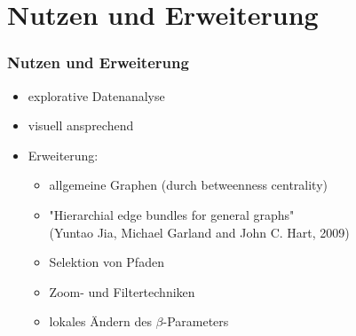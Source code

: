 \documentclass[11pt]{beamer}
\begin{document}
\section{Nutzen und Erweiterung}
\begin{frame}
\frametitle{Nutzen und Erweiterung}

\begin{itemize}
\item explorative Datenanalyse
\item visuell ansprechend
\item Erweiterung:
\begin{itemize} 
\item allgemeine Graphen (durch betweenness centrality)
\item "Hierarchial edge bundles for general graphs" 
\\(Yuntao Jia, Michael Garland and John C. Hart, 2009)
\item Selektion von Pfaden
\item Zoom- und Filtertechniken
\item lokales Ändern des $\beta$-Parameters 
\end{itemize}
\end{itemize}

\end{frame}
\end{document}
